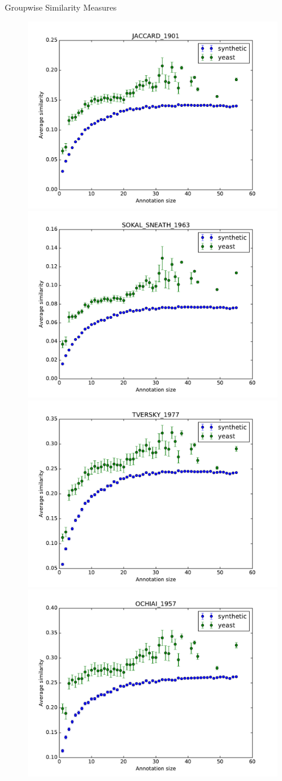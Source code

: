 \documentclass{beamer}
\begin{document}
\begin{frame}{Groupwise Similarity Measures}

\begin{figure}
\includegraphics[width=0.5\linewidth, height=0.4\textheight]{groupwise/SIM_FRAMEWORK_DAG_SET_JACCARD_1901_avg.pdf}
\includegraphics[width=0.5\linewidth, height=0.4\textheight]{groupwise/SIM_FRAMEWORK_DAG_SET_SOKAL_SNEATH_1963_avg.pdf} \\
\includegraphics[width=0.5\linewidth, height=0.4\textheight]{groupwise/SIM_FRAMEWORK_DAG_SET_TVERSKY_1977_avg.pdf}
\includegraphics[width=0.5\linewidth, height=0.4\textheight]{groupwise/SIM_FRAMEWORK_DAG_SET_OCHIAI_1957_avg.pdf}
\end{figure}

\end{frame}
\end{document}
